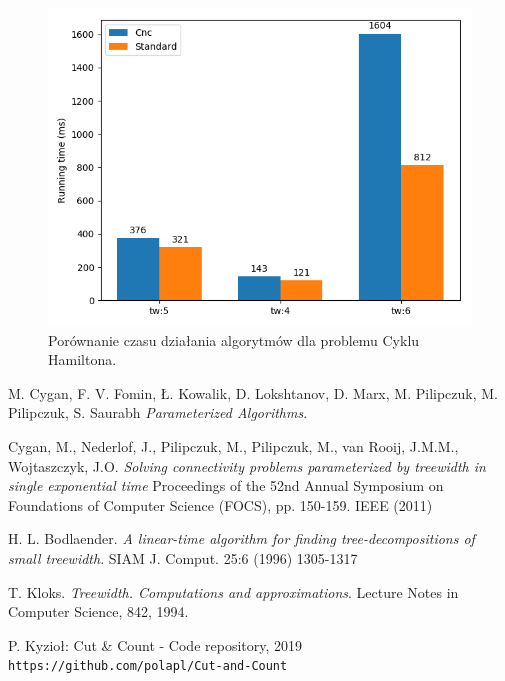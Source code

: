 \documentclass[12pt, oneside]{report}
\begin{document}
\begin{figure}
\centering
\includegraphics[width=14cm]{hamiltonian_test_time.png}
\caption{Porównanie czasu działania algorytmów dla problemu Cyklu Hamiltona.}
\label{hamiltonian_test_time}
\end{figure}


\newpage
	\begin{thebibliography}{9}
			M. Cygan, F. V. Fomin, Ł. Kowalik, D. Lokshtanov, D. Marx, M. Pilipczuk, M. Pilipczuk, S. Saurabh
 			\textit{Parameterized Algorithms}.
 			
 			Cygan, M., Nederlof, J., Pilipczuk, M., Pilipczuk, M., van Rooij, J.M.M., Wojtaszczyk,
J.O.
			\textit{Solving connectivity problems parameterized by treewidth in single
exponential time}
			Proceedings of the 52nd Annual Symposium on Foundations of Computer Science (FOCS), pp. 150-159. IEEE (2011)
 					
			H. L. Bodlaender. 
			\textit{A linear-time algorithm for finding tree-decompositions of small treewidth}. 
			SIAM J. Comput. 25:6 (1996) 1305-1317		
		
			T. Kloks. 
			\textit{Treewidth. Computations and approximations}. 
			Lecture Notes in Computer Science, 842, 1994.
 			
			P. Kyzioł: Cut \& Count - Code repository, 2019
			\\\texttt{https://github.com/polapl/Cut-and-Count}
	\end{thebibliography} 
\end{document}

